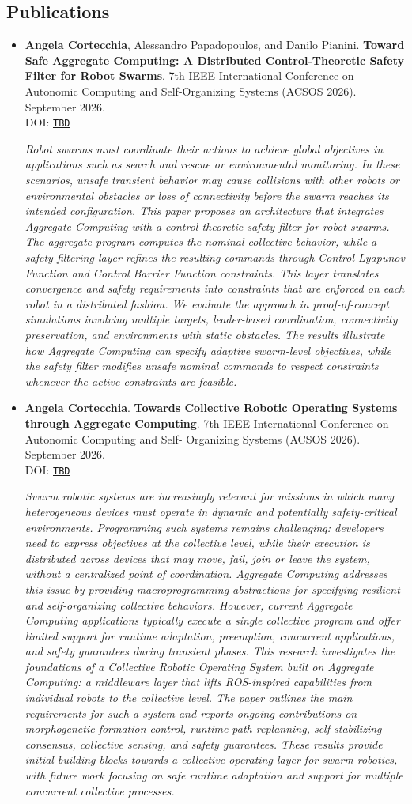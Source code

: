 \documentclass[11pt]{scrartcl}
\newcommand{\pubentry}[6]{%
  \item
  #1.
  \textbf{#2}.
  #3.
  #4.
  \if\relax\detokenize{#6}\relax\else
    \\ DOI: \href{https://doi.org/#6}{\texttt{#6}}%
  \fi

  \begin{sloppypar}
    \vspace{8pt}
    \textit{#5}
    \vspace{8pt}
  \end{sloppypar}
}
\newenvironment{publications}
  {%
    \subsection*{Publications}
    \begin{itemize}
  }
  {%
    \end{itemize}
  }
\begin{document}
\begin{publications}
  \pubentry
  {\textbf{Angela Cortecchia}, Alessandro Papadopoulos, and Danilo Pianini}
  {Toward Safe Aggregate Computing: A Distributed Control-Theoretic Safety Filter for Robot Swarms}
  {7th IEEE International Conference on Autonomic Computing and Self-Organizing Systems (ACSOS 2026)}
  {September 2026}
  {Robot swarms must coordinate their actions to achieve global objectives in applications such as search and rescue or environmental monitoring. In these scenarios, unsafe transient behavior may cause collisions with other robots or environmental obstacles or loss of connectivity before the swarm reaches its intended configuration. This paper proposes an architecture that integrates Aggregate Computing with a control-theoretic safety filter for robot swarms. The aggregate program computes the nominal collective behavior, while a safety-filtering layer refines the resulting commands through Control Lyapunov Function and Control Barrier Function constraints. This layer translates convergence and safety requirements into constraints that are enforced on each robot in a distributed fashion. We evaluate the approach in proof-of-concept simulations involving multiple targets, leader-based coordination, connectivity preservation, and environments with static obstacles. The results illustrate how Aggregate Computing can specify adaptive swarm-level objectives, while the safety filter modifies unsafe nominal commands to respect constraints whenever the active constraints are feasible.}
  {TBD}

  \pubentry
  {\textbf{Angela Cortecchia}}
  {Towards Collective Robotic Operating Systems through Aggregate Computing}
  {7th IEEE International Conference on Autonomic Computing and Self- Organizing Systems (ACSOS 2026)}
  {September 2026}
  {Swarm robotic systems are increasingly relevant for missions in which many heterogeneous devices must operate in dynamic and potentially safety-critical environments. Programming such systems remains challenging: developers need to express objectives at the collective level, while their execution is distributed across devices that may move, fail, join or leave the system, without a centralized point of coordination. Aggregate Computing addresses this issue by providing macroprogramming abstractions for specifying resilient and self-organizing collective behaviors. However, current Aggregate Computing applications typically execute a single collective program and offer limited support for runtime adaptation, preemption, concurrent applications, and safety guarantees during transient phases. This research investigates the foundations of a Collective Robotic Operating System built on Aggregate Computing: a middleware layer that lifts ROS-inspired capabilities from individual robots to the collective level. The paper outlines the main requirements for such a system and reports ongoing contributions on morphogenetic formation control, runtime path replanning, self-stabilizing consensus, collective sensing, and safety guarantees. These results provide initial building blocks towards a collective operating layer for swarm robotics, with future work focusing on safe runtime adaptation and support for multiple concurrent collective processes.}
  {TBD}


\end{publications}
\end{document}
